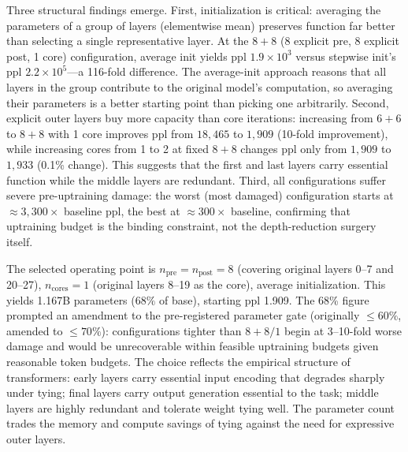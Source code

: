 Three structural findings emerge. First, initialization is critical: averaging the parameters of a group of layers (elementwise mean) preserves function far better than selecting a single representative layer. At the $8+8$ (8 explicit pre, 8 explicit post, 1 core) configuration, average init yields ppl $1.9 \times 10^3$ versus stepwise init's ppl $2.2 \times 10^5$---a 116-fold difference. The average-init approach reasons that all layers in the group contribute to the original model's computation, so averaging their parameters is a better starting point than picking one arbitrarily. Second, explicit outer layers buy more capacity than core iterations: increasing from $6+6$ to $8+8$ with 1 core improves ppl from $18,465$ to $1,909$ (10-fold improvement), while increasing cores from 1 to 2 at fixed $8+8$ changes ppl only from $1,909$ to $1,933$ (0.1\% change). This suggests that the first and last layers carry essential function while the middle layers are redundant. Third, all configurations suffer severe pre-uptraining damage: the worst (most damaged) configuration starts at $\approx 3,300\times$ baseline ppl, the best at $\approx 300\times$ baseline, confirming that uptraining budget is the binding constraint, not the depth-reduction surgery itself.

The selected operating point is $n_\text{pre} = n_\text{post} = 8$ (covering original layers 0--7 and 20--27), $n_\text{cores} = 1$ (original layers 8--19 as the core), average initialization. This yields 1.167B parameters ($68\%$ of base), starting ppl 1.909. The 68\% figure prompted an amendment to the pre-registered parameter gate (originally $\leq 60\%$, amended to $\leq 70\%$): configurations tighter than $8+8/1$ begin at 3--10-fold worse damage and would be unrecoverable within feasible uptraining budgets given reasonable token budgets. The choice reflects the empirical structure of transformers: early layers carry essential input encoding that degrades sharply under tying; final layers carry output generation essential to the task; middle layers are highly redundant and tolerate weight tying well. The parameter count trades the memory and compute savings of tying against the need for expressive outer layers.

